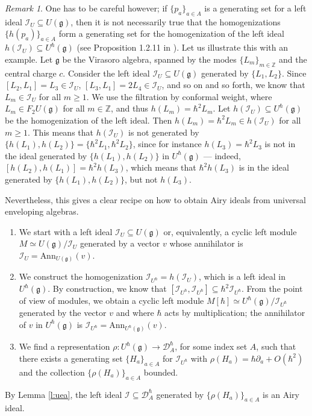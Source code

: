 \documentclass[reqno,oneside,11pt]{amsart}
\theoremstyle{plain}
\theoremstyle{definition}
\theoremstyle{remark}
\newtheorem{remark}[theorem]{Remark}
\numberwithin{equation}{section}
\newcommand{\DAh}{\mathcal{D}_A^{\hbar}}
\begin{document}
\begin{remark}
One has to be careful however; if $\{p_a\}_{a \in A}$ is a generating set for a left ideal $\mathcal{I}_U \subseteq U(\mathfrak{g})$, then it is not necessarily true that the homogenizations $\{h(p_a)\}_{a \in A}$ form a generating set for the homogenization of the left ideal $h(\mathcal{I}_U) \subseteq U^\hbar(\mathfrak{g})$ (see Proposition 1.2.11 in \cite{SST99}). Let us illustrate this with an example.
Let $\mathfrak{g}$ be the Virasoro algebra, spanned by the modes $\{L_m\}_{m \in \mathbb{Z}}$ and the central charge $c$. Consider the left ideal $\mathcal{I}_U \subseteq U(\mathfrak{g})$ generated by $\{L_1, L_2 \}$. Since $[L_2,L_1] = L_3 \in \mathcal{I}_U$, $[L_3,L_1] = 2 L_4 \in \mathcal{I}_U$, and so on and so forth, we know that $L_m \in \mathcal{I}_U$ for all $m \geq 1$. We use the filtration by conformal weight, where $L_m \in F_2 U(\mathfrak{g})$ for all $m \in \mathbb{Z}$, and thus $h(L_m) = \hbar^2 L_m$. Let $h(\mathcal{I}_U) \subseteq U^\hbar(\mathfrak{g})$ be the homogenization of the left ideal. Then $h(L_m)=\hbar^2 L_m \in h(\mathcal{I}_U)$ for all $m \geq 1$. This means that $h(\mathcal{I}_U)$ is not generated by $\{ h(L_1), h(L_2) \}=\{\hbar^2 L_1, \hbar^2 L_2\}$, since for instance $h(L_3) = \hbar^2 L_3$ is not in the ideal generated by $\{h(L_1), h(L_2) \}$ in $U^\hbar(\mathfrak{g})$ --- indeed, $[h(L_2), h(L_1)] = \hbar^2 h(L_3)$, which means that $\hbar^2 h(L_3)$ is in the  ideal generated by $\{h(L_1), h(L_2) \}$, but not $h(L_3)$.
\end{remark}

Nevertheless, this gives a clear recipe on how to obtain Airy ideals from universal enveloping algebras.

\begin{enumerate}
\item We start with a left ideal $\mathcal{I}_U \subseteq U(\mathfrak{g})$ or, equivalently, a cyclic left module $M \simeq U(\mathfrak{g})/ \mathcal{I}_U$ generated by a vector $v$ whose annihilator is $\mathcal{I}_U = \text{Ann}_{U(\mathfrak{g})}(v)$.
\item We construct the homogenization $\mathcal{I}_{U^\hbar}= h(\mathcal{I}_U)$, which is a left ideal in $U^\hbar(\mathfrak{g})$.  By construction, we know that $[\mathcal{I}_{U^\hbar}, \mathcal{I}_{U^\hbar}] \subseteq \hbar^2 \mathcal{I}_{U^\hbar}$. From the point of view of modules, we obtain a cyclic left module $M[\hbar] \simeq U^\hbar(\mathfrak{g})/\mathcal{I}_{U^\hbar}$ generated by the vector $v$ and where $\hbar$ acts by multiplication; the annihilator of $v$ in $U^\hbar(\mathfrak{g})$ is $\mathcal{I}_{U^\hbar} = \text{Ann}_{U^\hbar(\mathfrak{g})}(v)$.
\item We find a representation $\rho: U^\hbar(\mathfrak{g}) \to \DAh$, for some index set $A$, such that there exists a  generating set $\{H_a\}_{a \in A}$ for $\mathcal{I}_{U^\hbar}$ with $\rho(H_a) = \hbar \partial_a + O(\hbar^2)$ and the collection $\{\rho(H_a)\}_{a \in A}$ bounded.
\end{enumerate}
By Lemma \ref{l:uea}, the left ideal $\mathcal{I} \subseteq \DAh$ generated by $\{\rho(H_a)\}_{a \in A}$ is an Airy ideal.
\end{document}
